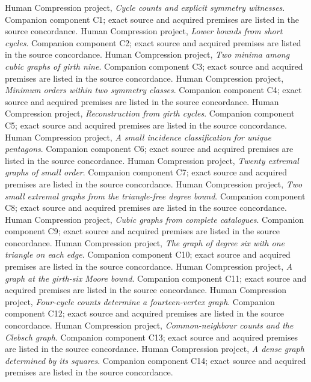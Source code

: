  Human Compression project, \emph{Cycle counts and explicit symmetry witnesses}. Companion component C1; exact source and acquired premises are listed in the source concordance.
 Human Compression project, \emph{Lower bounds from short cycles}. Companion component C2; exact source and acquired premises are listed in the source concordance.
 Human Compression project, \emph{Two minima among cubic graphs of girth nine}. Companion component C3; exact source and acquired premises are listed in the source concordance.
 Human Compression project, \emph{Minimum orders within two symmetry classes}. Companion component C4; exact source and acquired premises are listed in the source concordance.
 Human Compression project, \emph{Reconstruction from girth cycles}. Companion component C5; exact source and acquired premises are listed in the source concordance.
 Human Compression project, \emph{A small incidence classification for unique pentagons}. Companion component C6; exact source and acquired premises are listed in the source concordance.
 Human Compression project, \emph{Twenty extremal graphs of small order}. Companion component C7; exact source and acquired premises are listed in the source concordance.
 Human Compression project, \emph{Two small extremal graphs from the triangle-free degree bound}. Companion component C8; exact source and acquired premises are listed in the source concordance.
 Human Compression project, \emph{Cubic graphs from complete catalogues}. Companion component C9; exact source and acquired premises are listed in the source concordance.
 Human Compression project, \emph{The graph of degree six with one triangle on each edge}. Companion component C10; exact source and acquired premises are listed in the source concordance.
 Human Compression project, \emph{A graph at the girth-six Moore bound}. Companion component C11; exact source and acquired premises are listed in the source concordance.
 Human Compression project, \emph{Four-cycle counts determine a fourteen-vertex graph}. Companion component C12; exact source and acquired premises are listed in the source concordance.
 Human Compression project, \emph{Common-neighbour counts and the Clebsch graph}. Companion component C13; exact source and acquired premises are listed in the source concordance.
 Human Compression project, \emph{A dense graph determined by its squares}. Companion component C14; exact source and acquired premises are listed in the source concordance.
